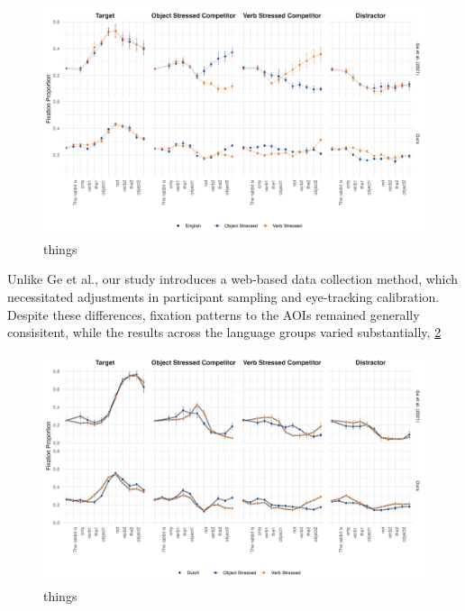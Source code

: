 \begin{figure}[H]  %
    \centering
    \includegraphics[width=\textwidth,height=\textheight,keepaspectratio]{viz/english_fix.png}
    \caption{things}
    \label{fig:english_fix}
\end{figure}

Unlike Ge et al., our study introduces a web-based data collection method, which necessitated adjustments in participant sampling and eye-tracking calibration. Despite these differences, fixation patterns to the AOIs remained generally consisitent, while the results across the language groups varied substantially, \ref{fig:dutch_fix}

\begin{figure}[H]  %
    \centering
    \includegraphics[width=\textwidth,height=\textheight,keepaspectratio]{viz/dutch_fix.png}
    \caption{things}
    \label{fig:dutch_fix}
\end{figure}


